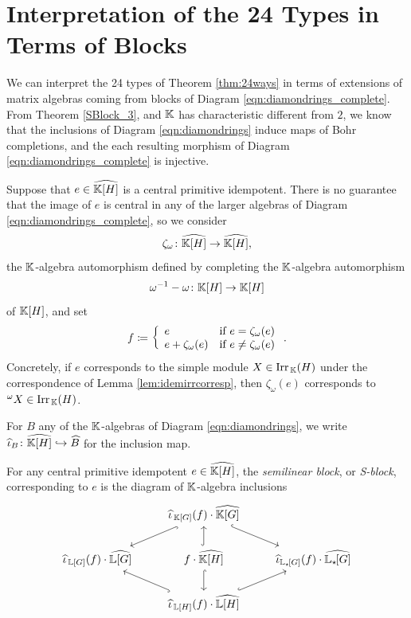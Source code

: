 \section{Interpretation of the 24 Types in Terms of Blocks}\label{sect:blockinterpretation}

We can interpret the 24 types of Theorem \ref{thm:24ways} in terms of extensions of matrix algebras coming from blocks of Diagram \eqref{eqn:diamondrings_complete}. From Theorem \ref{SBlock_3}, and ${\mathbb K}$ has characteristic different from $2$, we know that the inclusions of Diagram \eqref{eqn:diamondrings} induce maps of Bohr completions, and the each resulting morphism of Diagram \eqref{eqn:diamondrings_complete} is injective.

Suppose that $e \in \widehat{{\mathbb K}[H]}$ is a central primitive idempotent. There is no guarantee that the image of $e$ is central in any of the larger algebras of Diagram \eqref{eqn:diamondrings_complete}, so we consider
\[
\zeta_{\omega} \colon \widehat{{\mathbb K}[H]} \rightarrow \widehat{{\mathbb K}[H]},
\]
the ${\mathbb K}$-algebra automorphism defined by completing the ${\mathbb K}$-algebra automorphism
\[
\omega^{-1} - \omega \colon {\mathbb K}[H] \rightarrow {\mathbb K}[H]
\]
of ${\mathbb K}[H]$, and set
\[
f \coloneqq \left\{ \begin{array}{ll} e & \mbox{if } e = \zeta_{\omega}(e) \\ e + \zeta_{\omega}(e) & \mbox{if } e \neq \zeta_{\omega}(e) \end{array} \right..
\] 
Concretely, if $e$ corresponds to the simple module $X \in \operatorname{Irr}_{\, {\mathbb K}}(H)$ under the correspondence of Lemma \ref{lem:idemirrcorresp}, then $\zeta_{\omega}(e)$ corresponds to ${}^{\omega} X \in \operatorname{Irr}_{\, {\mathbb K}}(H)$.

For $B$ any of the ${\mathbb K}$-algebras of Diagram \ref{eqn:diamondrings}, we write $\widehat{\iota}_B \colon \widehat{{\mathbb K}[H]} \hookrightarrow \widehat{B}$ for the inclusion map.

\begin{defn}\label{def:ideminbigger}
    For any central primitive idempotent $e \in \widehat{{\mathbb K}[H]}$, the \emph{semilinear block}, or \emph{S-block}, corresponding to $e$ is the diagram of ${\mathbb K}$-algebra inclusions
    \[
     \begin{tikzcd}
	& \widehat{\iota}_{\bbK[G]}(f) \cdot \widehat{\bK[G]} \\
	\widehat{\iota}_{\bbL[G]}(f) \cdot \widehat{\bL[G]} & f \cdot \widehat{\bK[H]} & \widehat{\iota}_{\bL_{\star \hspace{-0.1em}}[G]}(f) \cdot \widehat{\bL_{\star \hspace{-0.1em}}[G]} \\
	& \widehat{\iota}_{\bbL[H]}(f)\cdot \widehat{\bL[H]}
	\arrow[hook, from=1-2, to=2-1]
	\arrow[hook, from=1-2, to=2-3]
	\arrow[hook, from=2-2, to=1-2]
	\arrow[hook, from=2-2, to=3-2]
	\arrow[hook, from=3-2, to=2-1]
	\arrow[hook, from=3-2, to=2-3]
\end{tikzcd}
\]
\end{defn}

